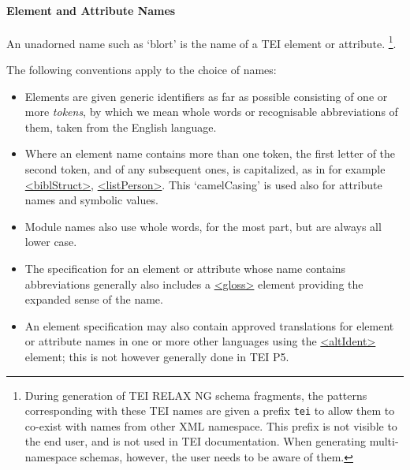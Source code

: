 \paragraph[{Element and Attribute Names}]{Element and Attribute Names}\par
An unadorned name such as ‘blort’ is the name of a TEI element or attribute. \footnote{During generation of TEI RELAX NG schema fragments, the patterns corresponding with these TEI names are given a prefix \texttt{tei} to allow them to co-exist with names from other XML namespace. This prefix is not visible to the end user, and is not used in TEI documentation. When generating multi-namespace schemas, however, the user needs to be aware of them.}.\par
The following conventions apply to the choice of names: \begin{itemize}
\item Elements are given generic identifiers as far as possible consisting of one or more \textit{tokens}, by which we mean whole words or recognisable abbreviations of them, taken from the English language.
\item Where an element name contains more than one token, the first letter of the second token, and of any subsequent ones, is capitalized, as in for example \hyperref[TEI.biblStruct]{<biblStruct>}, \hyperref[TEI.listPerson]{<listPerson>}. This ‘camelCasing’ is used also for attribute names and symbolic values.
\item Module names also use whole words, for the most part, but are always all lower case. 
\item The specification for an element or attribute whose name contains abbreviations generally also includes a \hyperref[TEI.gloss]{<gloss>} element providing the expanded sense of the name.
\item An element specification may also contain approved translations for element or attribute names in one or more other languages using the \hyperref[TEI.altIdent]{<altIdent>} element; this is not however generally done in TEI P5.
\end{itemize} \par
